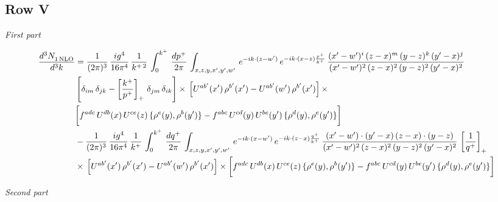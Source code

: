 \documentclass[9pt]{article}
\numberwithin{equation}{section}
\begin{document}
\subsection{Row V}
{\color{orange}\sloppy{}\par
\par\noindent\textit{First part}\par
\begin{align*}
     \frac{d^{3}N_{1\,\rm NLO}^{\rm}}{d^{3}k}  & =  \frac{1}{(2\pi)^{3}}\, \frac{ig^{4}}{16\pi^{4}}\, \frac{1}{k^{+\,2}}\,\int_{0}^{k^{+}}\, \frac{dp^{+}}{2\pi}\,\int_{x,z,y,x',y',w'}\,e^{-ik\cdot (z-w^\prime)}\,e^{-ik\cdot (x-z)\frac{p^{+}}{k^{+}}}\,\frac{(x'-w')^{i}\,(z-x)^{m}\,(y-z)^{k}\,(y'-x)^{j}}{(x'-w')^{2}\,(z-x)^{2}\,(y-z)^{2}\,(y'-x)^{2}}\,\notag \\ & \left[\delta_{im}\,\delta_{jk}-\left[\frac{k^{+}}{p^{+}}\right]_{+}\, \delta_{jm}\,\delta_{ik}\right]\times\, \left[U^{ab'}(x')\,\rho^{b'}(x')-U^{ab'}(w')\,\rho^{b'}(x')\right]\times\notag \\ & \bigg[f^{adc}\,U^{db}(x)\,U^{ce}(z)\, \{\rho^{e}(y),\rho^{b}(y')\}-f^{abc}\,U^{cd}(y)\,U^{be}(y')\, \{\rho^{d}(y),\rho^{e}(y')\}\bigg] \notag \\ & -\frac{1}{(2\pi)^{3}}\, \frac{ig^{4}}{16\pi^{4}}\, \frac{1}{k^{+}}\,\int_{0}^{k^{+}}\, \frac{dq^{+}}{2\pi}\,\int_{x,z,y,x',y',w'}\,e^{-ik\cdot (x-w^\prime)}\,e^{-ik\cdot (z-x)\frac{q^{+}}{k^{+}}}\,\frac{(x'-w')\cdot (y'-x)\,(z-x)\cdot (y-z)}{(x'-w')^{2}\,(z-x)^{2}\,(y-z)^{2}\,(y'-x)^{2}}\,\left[\frac{1}{q^{+}}\right]_{+}\notag \\ & \times\, \left[U^{ab'}(x')\,\rho^{b'}(x')-U^{ab'}(w')\,\rho^{b'}(x')\right]\times \bigg[f^{adc}\,U^{db}(x)\,U^{ce}(z)\, \{\rho^{e}(y),\rho^{b}(y')\}-f^{abc}\,U^{cd}(y)\,U^{be}(y')\, \{\rho^{d}(y),\rho^{e}(y')\}\bigg]
\end{align*}
\par\noindent\textit{Second part}\par
\begin{align*}

\end{align*}}
\end{document}
